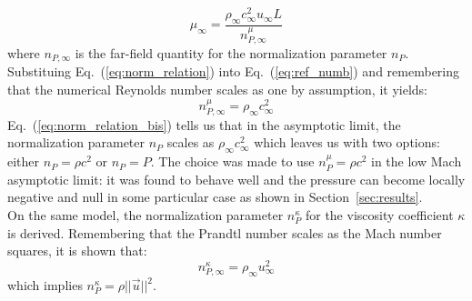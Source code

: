 \documentclass[preprint,10pt]{elsarticle}
\newcommand{\eqt}[1]{Eq.~(\ref{#1})}                     %
\newcommand{\sct}[1]{Section~\ref{#1}}                   %
\begin{document}
\begin{equation}
\label{eq:norm_relation}
\mu_{\infty} = \frac{ \rho_{\infty} c_{\infty}^2 u_{\infty} L }{ n_{P,\infty}^{\mu} } 
\end{equation}
where $n_{P,\infty}$ is the far-field quantity for the normalization parameter $n_P$. Substituing \eqt{eq:norm_relation} into \eqt{eq:ref_numb} and remembering that the numerical Reynolds number scales as one by assumption, it yields:
\begin{equation}
\label{eq:norm_relation_bis}
n_{P,\infty}^{\mu} = \rho_{\infty} c_{\infty}^2
\end{equation}
\eqt{eq:norm_relation_bis} tells us that in the asymptotic limit, the normalization parameter $n_P$ scales as $\rho_{\infty} c_{\infty}^2$ which leaves us with two options:
either $n_P = \rho c^2$ or $n_P = P$. The choice was made to use $n_P^{\mu} = \rho c^2$ in the low Mach asymptotic limit: it was found to behave well and the pressure can become locally negative and null in some particular case as shown in \sct{sec:results}. \\
On the same model, the normalization parameter $n_P^{\kappa}$ for the viscosity coefficient $\kappa$ is derived. Remembering that the Prandtl number scales as the Mach number squares, it is shown that:
\begin{equation}
\label{eq:norm_relation_ter}
n_{P,\infty}^{\kappa} = \rho_{\infty} u_{\infty}^2
\end{equation}
which implies $n_{P}^{\kappa} = \rho ||\vec{u} ||^2$.\\
\end{document}
